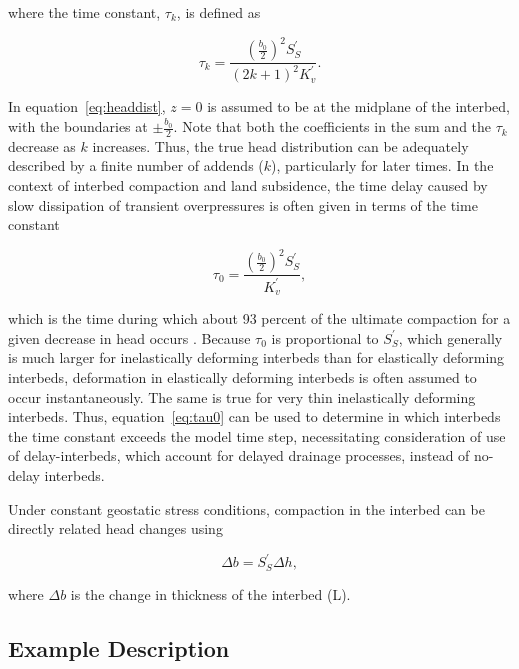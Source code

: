 \noindent where the time constant, $\tau_k$, is defined as 

\begin{equation}
	\tau_k = \frac{ \left( \frac{b_0}{2} \right)^2 S^{\prime}_{S} }{\left( 2k + 1 \right)^2 K^{\prime}_{v}}.
	\label{eq:tauk}
\end{equation}

In equation~\ref{eq:headdist}, $z = 0$ is assumed to be at the midplane of the interbed, with the boundaries at $\pm \frac{b_0}{2}$. Note that both the coefficients in the sum and the $\tau_k$ decrease as $k$ increases. Thus, the true head distribution can be adequately described by a finite number of addends ($k$), particularly for later times. In the context of interbed compaction and land subsidence, the time delay caused by slow dissipation of transient overpressures is often given in terms of the time constant

\begin{equation}
	\tau_0 = \frac{ \left( \frac{b_0}{2} \right)^2 S^{\prime}_{S} }{K^{\prime}_{v}},
	\label{eq:tau0}
\end{equation}

\noindent which is the time during which about 93 percent of the ultimate compaction for a given decrease in head occurs \citep{riley1969analysis}. Because $\tau_0$ is proportional to $S^{\prime}_{S} $, which generally is much larger for inelastically deforming interbeds than for elastically deforming interbeds, deformation in elastically deforming interbeds is often assumed to occur instantaneously. The same is true for very thin inelastically deforming interbeds. Thus, equation~\ref{eq:tau0} can be used to determine in which interbeds the time constant exceeds the model time step, necessitating consideration of use of delay-interbeds, which account for delayed drainage processes, instead of no-delay interbeds.

Under constant geostatic stress conditions, compaction in the interbed can be directly related head changes using

\begin{equation}
	\Delta b = S^{\prime}_{S} \Delta h,
	\label{eq:compaction}
\end{equation}

\noindent where $\Delta b$ is the change in thickness of the interbed (L).

\subsection{Example Description}

